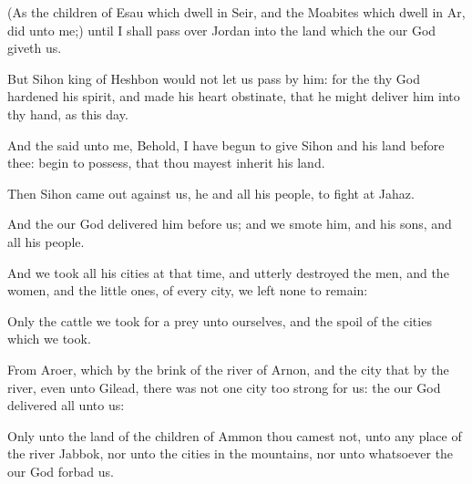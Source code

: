 {(As the
children of
Esau which
dwell in
Seir, and the
Moabites which
dwell in
Ar,
did unto me;) until I shall pass
over
Jordan into the
land which the
{} our
God
giveth us.

But
Sihon
king of
Heshbon
would not let us
pass by him: for the
{} thy
God
hardened his
spirit, and made his
heart
obstinate, that he might
deliver him into thy
hand, as
{} this
day.

And the
{}
said unto me,
Behold, I have
begun to
give
Sihon and his
land
before thee:
begin to
possess, that thou mayest
inherit his
land.

Then
Sihon came
out
against us, he and all his
people, to
fight at
Jahaz.

And the
{} our
God
delivered him
before us; and we
smote him, and his
sons, and all his
people.

And we
took all his
cities at that
time, and utterly
destroyed the
men, and the
women, and the little
ones, of every
city, we
left none to
remain:

Only the
cattle we took for a
prey unto ourselves, and the
spoil of the
cities which we
took.

From
Aroer, which
{} by the
brink of the
river of
Arnon, and
{} the
city that
{} by the
river, even unto
Gilead, there was not one
city too
strong for us: the
{} our
God
delivered all unto
us:

Only unto the
land of the
children of
Ammon thou
camest not,
{} unto any
place of the
river
Jabbok, nor unto the
cities in the
mountains, nor unto whatsoever the
{} our
God
forbad us.




\par }
